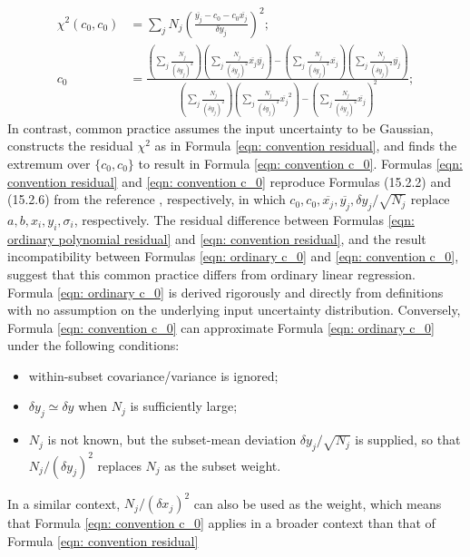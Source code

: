 \documentclass[twoside]{article}
\numberwithin{equation}{section}
\begin{document}
\begin{align}
\label{eqn: convention residual}
\chi^2(c_0, c_0) &= \sum_j N_j \left(\frac{\overline{y_j} - c_0 - c_0 \overline{x_j}}{\delta y_j} \right)^2; \\
\label{eqn: convention c_0}
c_0 &= \frac{\left(\sum_j \frac{N_j}{(\delta y_j)^2} \right) \left(\sum_j \frac{N_j}{(\delta y_j)^2} \overline{x_j} \overline{y_j}\right)
					- \left(\sum_j \frac{N_j}{(\delta y_j)^2} \overline{x_j} \right) \left(\sum_j \frac{N_j}{(\delta y_j)^2} \overline{y_j}\right)}
			{\left(\sum_j \frac{N_j}{(\delta y_j)^2} \right) \left(\sum_j \frac{N_j}{(\delta y_j)^2} \overline{x_j}^2\right)
				- \left(\sum_j \frac{N_j}{(\delta y_j)^2} \overline{x_j} \right)^2};
\end{align}
In contrast, common practice \cite{Statistical_Methods, Numerical_Recipes} assumes the input uncertainty to be Gaussian, constructs the residual $\chi^2$ as in Formula \eqref{eqn: convention residual}, and finds the extremum over $\{ c_0, c_0 \}$ to result in Formula \eqref{eqn: convention c_0}.
Formulas \eqref{eqn: convention residual} and \eqref{eqn: convention c_0} reproduce Formulas (15.2.2) and (15.2.6) from the reference \cite{Numerical_Recipes}, respectively, in which $c_0, c_0, \overline{x_j}, \overline{y_j}, \delta y_j/\sqrt{N_j}$ replace $a, b, x_i, y_i, \sigma_i$, respectively.
The residual difference between Formulas \eqref{eqn: ordinary polynomial residual} and \eqref{eqn: convention residual}, and the result incompatibility between Formulas \eqref{eqn: ordinary c_0} and \eqref{eqn: convention c_0}, suggest that this common practice differs from ordinary linear regression. 
Formula \eqref{eqn: ordinary c_0} is derived rigorously and directly from definitions with no assumption on the underlying input uncertainty distribution.
Conversely, Formula \eqref{eqn: convention c_0} can approximate Formula \eqref{eqn: ordinary c_0} under the following conditions:
\begin{itemize}
\item within-subset covariance/variance is ignored;
\item $\delta y_j \simeq \delta y$ when $N_j$ is sufficiently large;
\item $N_j$ is not known, but the subset-mean deviation $\delta y_j/\sqrt{N_j}$ is supplied, so that $N_j/(\delta y_j)^2$ replaces $N_j$ as the subset weight.
\end{itemize}
In a similar context, $N_j/(\delta x_j)^2$ can also be used as the weight, which means that Formula \eqref{eqn: convention c_0} applies in a broader context than that of Formula \eqref{eqn: convention residual}
\end{document}
